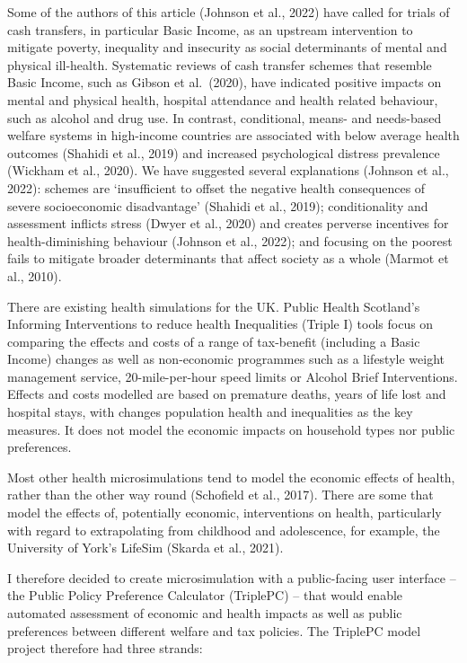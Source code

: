 \documentclass[
  letterpaper,
  DIV=11,
  numbers=noendperiod]{scrartcl}
\begin{document}
Some of the authors of this article (Johnson et al., 2022) have called
for trials of cash transfers, in particular Basic Income, as an upstream
intervention to mitigate poverty, inequality and insecurity as social
determinants of mental and physical ill-health. Systematic reviews of
cash transfer schemes that resemble Basic Income, such as Gibson et
al.~(2020), have indicated positive impacts on mental and physical
health, hospital attendance and health related behaviour, such as
alcohol and drug use. In contrast, conditional, means- and needs-based
welfare systems in high-income countries are associated with below
average health outcomes (Shahidi et al., 2019) and increased
psychological distress prevalence (Wickham et al., 2020). We have
suggested several explanations (Johnson et al., 2022): schemes are
`insufficient to offset the negative health consequences of severe
socioeconomic disadvantage' (Shahidi et al., 2019); conditionality and
assessment inflicts stress (Dwyer et al., 2020) and creates perverse
incentives for health-diminishing behaviour (Johnson et al., 2022); and
focusing on the poorest fails to mitigate broader determinants that
affect society as a whole (Marmot et al., 2010).

There are existing health simulations for the UK. Public Health
Scotland's Informing Interventions to reduce health Inequalities (Triple
I) tools focus on comparing the effects and costs of a range of
tax-benefit (including a Basic Income) changes as well as non-economic
programmes such as a lifestyle weight management service,
20-mile-per-hour speed limits or Alcohol Brief Interventions. Effects
and costs modelled are based on premature deaths, years of life lost and
hospital stays, with changes population health and inequalities as the
key measures. It does not model the economic impacts on household types
nor public preferences.

Most other health microsimulations tend to model the economic effects of
health, rather than the other way round (Schofield et al., 2017). There
are some that model the effects of, potentially economic, interventions
on health, particularly with regard to extrapolating from childhood and
adolescence, for example, the University of York's LifeSim (Skarda et
al., 2021).

I therefore decided to create microsimulation with a public-facing user
interface -- the Public Policy Preference Calculator (TriplePC) -- that
would enable automated assessment of economic and health impacts as well
as public preferences between different welfare and tax policies. The
TriplePC model project therefore had three strands:
\end{document}
